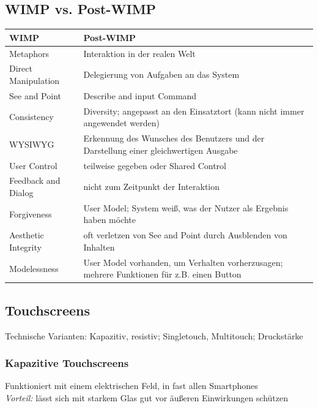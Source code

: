 \documentclass
[
	8pt,		%
	ngerman,	%
	a4paper,	%
	landscape,	%
	final		%
]{extarticle}
\begin{document}
\begin{multicols*}{4}
	\subsection{WIMP vs. Post-WIMP}
	\begin{tabularx}{\linewidth}{|l|X|} \hline
		WIMP                & Post-WIMP                                                                                  \\\hline
		Metaphors           & Interaktion in der realen Welt                                                             \\\hline
		Direct Manipulation & Delegierung von Aufgaben an das System                                                     \\\hline
		See and Point       & Describe and input Command                                                                 \\\hline
		Consistency         & Diversity; angepasst an den Einsatztort (kann nicht immer angewendet werden)               \\\hline
		WYSIWYG             & Erkennung des Wunsches des Benutzers und der Darstellung einer gleichwertigen Ausgabe      \\\hline
		User Control        & teilweise gegeben oder Shared Control                                                      \\\hline
		Feedback and Dialog & nicht zum Zeitpunkt der Interaktion                                                        \\\hline
		Forgiveness         & User Model; System weiß, was der Nutzer als Ergebnis haben möchte                          \\\hline
		Aesthetic Integrity & oft verletzen von See and Point durch Ausblenden von Inhalten                              \\\hline
		Modelessness        & User Model vorhanden, um Verhalten vorherzusagen; mehrere Funktionen für z.B. einen Button \\\hline
	\end{tabularx}
	\subsection{Touchscreens}
	Technische Varianten: Kapazitiv, resistiv; Singletouch, Multitouch;
	Druckstärke
	\subsubsection{Kapazitive Touchscreens}
	Funktioniert mit einem elektrischen Feld, in fast allen Smartphones \\
	\textit{Vorteil:} lässt sich mit starkem Glas gut vor äußeren Einwirkungen
	schützen

\end{multicols*}
\end{document}
